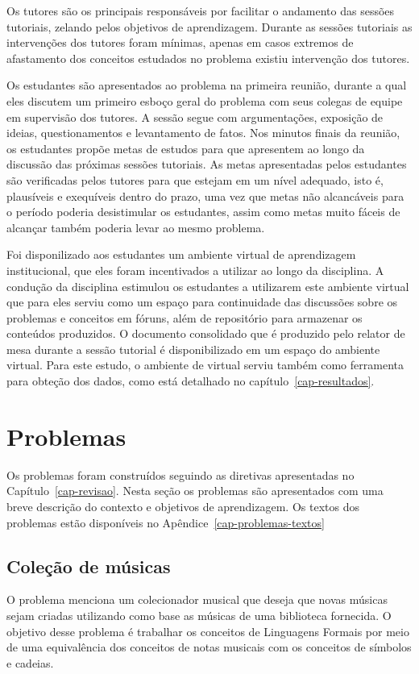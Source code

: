 Os tutores são os principais responsáveis por facilitar o andamento
das sessões tutoriais, zelando pelos objetivos de aprendizagem.
Durante as sessões tutoriais as intervenções dos tutores
foram mínimas, apenas em casos extremos de
afastamento dos conceitos estudados no problema existiu intervenção dos tutores.

Os estudantes são apresentados ao problema na primeira reunião, durante
a qual eles discutem um primeiro esboço geral do problema com seus
colegas de equipe em supervisão dos tutores.
A sessão segue com argumentações, exposição de ideias,
questionamentos e levantamento de fatos.
Nos minutos finais da reunião, os estudantes propõe metas de estudos para
que apresentem ao longo da discussão das próximas sessões tutoriais.
As metas apresentadas pelos estudantes são verificadas pelos tutores
para que estejam em um nível adequado, isto é, plausíveis e exequíveis
dentro do prazo, uma vez que metas não
alcancáveis para o período poderia desistimular os estudantes, assim
como metas muito fáceis de alcançar também poderia levar
ao mesmo problema.

Foi disponilizado aos estudantes um ambiente virtual de aprendizagem
institucional, que eles foram incentivados a utilizar ao longo
da disciplina.
A condução da disciplina estimulou os estudantes a
utilizarem este ambiente virtual que para eles serviu como um
espaço para continuidade das discussões sobre os problemas
e conceitos em fóruns, além de repositório para armazenar
os conteúdos produzidos.
O documento consolidado que é produzido pelo relator de mesa
durante a sessão tutorial é disponibilizado em um espaço
do ambiente virtual.
Para este estudo, o ambiente de virtual serviu
também como ferramenta para obteção dos dados,
como está detalhado no
capítulo~\ref{cap-resultados}.

\section{Problemas}
Os problemas foram construídos seguindo as diretivas
apresentadas no Capítulo~\ref{cap-revisao}.
Nesta seção os problemas são apresentados com uma breve
descrição do contexto e objetivos de aprendizagem.
Os textos dos problemas estão disponíveis no
Apêndice~\ref{cap-problemas-textos}

\subsection{Coleção de músicas}
O problema menciona um colecionador musical que deseja que
novas músicas sejam criadas utilizando como base as músicas
de uma biblioteca fornecida.
O objetivo desse problema é trabalhar os conceitos de
Linguagens Formais por meio de uma equivalência dos conceitos
de notas musicais com os conceitos de símbolos e cadeias.

